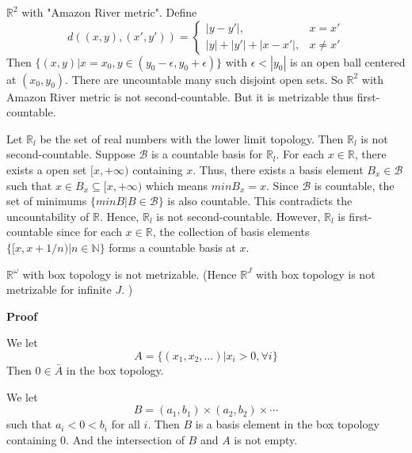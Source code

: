 \documentclass[main.tex]{subfiles}
\begin{document}
\begin{example}
    $\mathbb{R}^2$ with "Amazon River metric". Define 
    \begin{equation}
        d((x, y), (x', y')) = \begin{cases}
            |y - y'|, & x = x' \\ 
            |y| + |y'| + |x - x'|, & x \neq x'
    \end{cases}
    \end{equation}
    Then $\{(x, y)| x = x_0, y\in (y_0 - \epsilon, y_0 + \epsilon)\}$ with $\epsilon < |y_0|$ is an open ball centered at $(x_0, y_0)$. There are uncountable many such disjoint open sets. So $\mathbb{R}^2$ with Amazon River metric is not second-countable. But it is metrizable thus first-countable. 
\end{example}
\begin{example}
    Let $\mathbb{R}_l $ be the set of real numbers with the lower limit topology. Then $\mathbb{R}_l$ is not second-countable. Suppose $\mathcal{B}$ is a countable basis for $\mathbb{R}_l$. For each $x \in \mathbb{R}$, there exists a open set $[x, +\infty)$ containing $x$. Thus, there exists a basis element $B_x \in \mathcal{B}$ such that $x \in B_x \subseteq [x, +\infty)$ which means $minB_x = x$. Since $\mathcal{B}$ is countable, the set of minimums $\{minB | B \in \mathcal{B}\}$ is also countable. This contradicts the uncountability of $\mathbb{R}$. Hence, $\mathbb{R}_l$ is not second-countable. However, $\mathbb{R}_l$ is first-countable since for each $x \in \mathbb{R}$, the collection of basis elements $\{[x, x + 1/n) | n \in \mathbb{N}\}$ forms a countable basis at $x$. 
\end{example}

\begin{property}
    $\mathbb{R}^{\omega}$ with box topology is not metrizable. (Hence $\mathbb{R}^J$ with box topology is not metrizable for infinite $J$. )
\end{property}
\par \noindent \textbf{Proof} 
\par We let 
\begin{equation}
    A = \{(x_1, x_2, \ldots) | x_i > 0, \forall i\}
\end{equation}
Then $0 \in \bar{A}$ in the box topology. 
\par We let 
\begin{equation}
    B = (a_1, b_1) \times (a_2, b_2) \times \cdots 
\end{equation}
such that $a_i < 0 < b_i$ for all $i$. Then $B$ is a basis element in the box topology containing $0$. And the intersection of $B$ and $A$ is not empty. 
\end{document}
